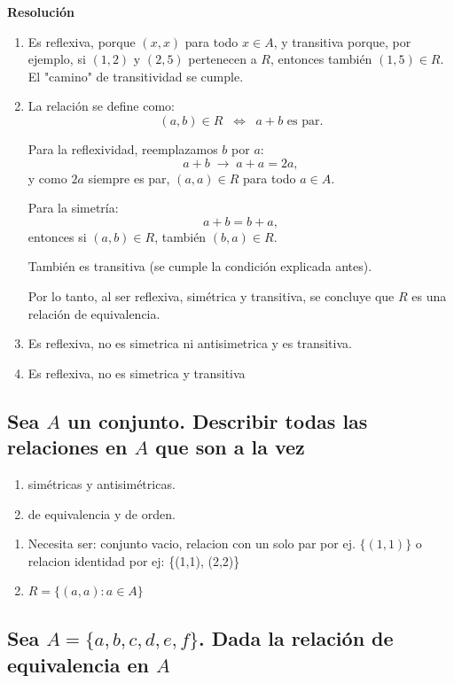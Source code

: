 \documentclass[11pt]{article}
\begin{document}
\textbf{Resolución}

\begin{enumerate}[label=\roman*)]
    \item Es reflexiva, porque $(x,x)$ para todo $x \in A$, y transitiva porque, por ejemplo, si $(1,2)$ y $(2,5)$ pertenecen a $R$, entonces también $(1,5) \in R$. El "camino" de transitividad se cumple. 

    \item La relación se define como:
    \[
        (a,b) \in R \;\;\Longleftrightarrow\;\; a+b \text{ es par}.
    \]

    Para la reflexividad, reemplazamos $b$ por $a$:
    \[
        a+b \;\longrightarrow\; a+a = 2a,
    \]
    y como $2a$ siempre es par, $(a,a) \in R$ para todo $a \in A$.

    Para la simetría:
    \[
        a+b = b+a,
    \]
    entonces si $(a,b) \in R$, también $(b,a) \in R$.

    También es transitiva (se cumple la condición explicada antes).  

    Por lo tanto, al ser reflexiva, simétrica y transitiva, se concluye que $R$ es una relación de equivalencia.

    \item Es reflexiva, no es simetrica ni antisimetrica y es transitiva.
    \item Es reflexiva, no es simetrica y transitiva
\end{enumerate}
\subsection{Sea $A$ un conjunto. Describir todas las relaciones en $A$ que son a la vez}

\begin{enumerate}[label=\roman*)]
    \item simétricas y antisimétricas.
    \item de equivalencia y de orden.
\end{enumerate}

\begin{enumerate}[label=\roman*)]
    \item Necesita ser: conjunto vacio, relacion con un solo par por ej. $\{(1, 1)\}$ o relacion identidad por ej: \{(1,1), (2,2)\}
    \item $R = \{(a,a): a \in A\}$
\end{enumerate}

\subsection{Sea $A = \{a, b, c, d, e, f\}$. Dada la relación de equivalencia en $A$}
\end{document}
